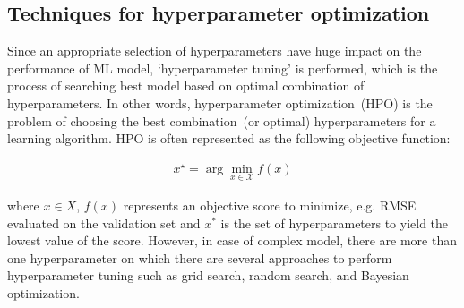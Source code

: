 \subsection{Techniques for hyperparameter optimization}
Since an appropriate selection of hyperparameters have huge impact on the performance of ML model, `hyperparameter tuning' is performed, which is the process of searching best model based on optimal combination of hyperparameters. In other words, hyperparameter optimization~(HPO) is the problem of choosing the best combination~(or optimal) hyperparameters for a learning algorithm. HPO is often represented as the following objective function: 

\vspace{-6mm}
\begin{align}
    x^{\star}=\arg \min _{x \in \mathcal{X}} f(x)
    \label{eq:hpt}
\end{align}

\hspace*{3.5mm} where $x \in X$, $f(x)$ represents an objective score to minimize, e.g. RMSE evaluated on the validation set and $x^*$ is the set of hyperparameters to yield the lowest value of the score. However, in case of complex model, there are more than one hyperparameter on which there are several approaches to perform hyperparameter tuning such as grid search, random search, and Bayesian optimization. 

